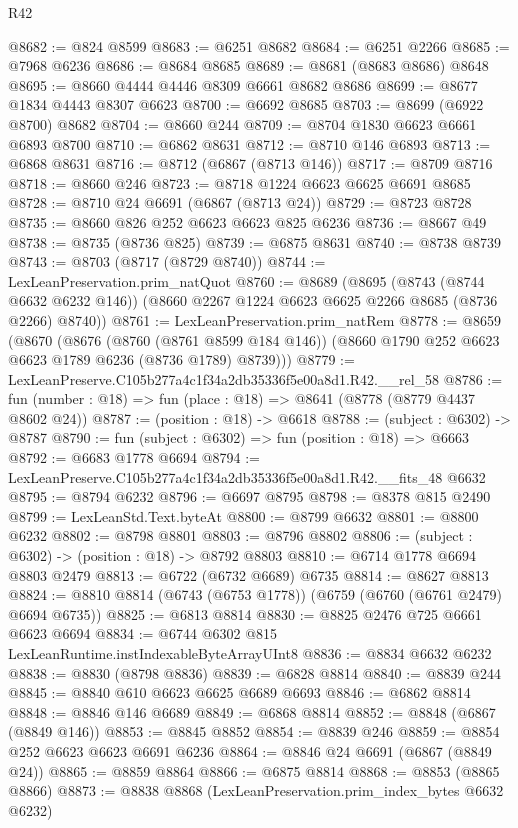 \begin{lexlean}{R42}
\begin{coremodule}
{@8682 := @824 @8599
@8683 := @6251 @8682
@8684 := @6251 @2266
@8685 := @7968 @6236
@8686 := @8684 @8685
@8689 := @8681 (@8683 @8686) @8648
@8695 := @8660 @4444 @4446 @8309 @6661 @8682 @8686
@8699 := @8677 @1834 @4443 @8307 @6623
@8700 := @6692 @8685
@8703 := @8699 (@6922 @8700) @8682
@8704 := @8660 @244
@8709 := @8704 @1830 @6623 @6661 @6893 @8700
@8710 := @6862 @8631
@8712 := @8710 @146 @6893
@8713 := @6868 @8631
@8716 := @8712 (@6867 (@8713 @146))
@8717 := @8709 @8716
@8718 := @8660 @246
@8723 := @8718 @1224 @6623 @6625 @6691 @8685
@8728 := @8710 @24 @6691 (@6867 (@8713 @24))
@8729 := @8723 @8728
@8735 := @8660 @826 @252 @6623 @6623 @825 @6236
@8736 := @8667 @49
@8738 := @8735 (@8736 @825)
@8739 := @6875 @8631
@8740 := @8738 @8739
@8743 := @8703 (@8717 (@8729 @8740))
@8744 := LexLeanPreservation.prim_natQuot
@8760 := @8689
    (@8695
      (@8743 (@8744 @6632 @6232 @146))
      (@8660 @2267 @1224 @6623 @6625 @2266 @8685 (@8736 @2266) @8740))
@8761 := LexLeanPreservation.prim_natRem
@8778 := @8659
    (@8670
      (@8676
        (@8760 (@8761 @8599 @184 @146))
        (@8660 @1790 @252 @6623 @6623 @1789 @6236 (@8736 @1789) @8739)))
@8779 := LexLeanPreserve.C105b277a4c1f34a2db35336f5e00a8d1.R42.__rel_58
@8786 := fun (number : @18) => fun (place : @18) => @8641 (@8778 (@8779 @4437 @8602 @24))
@8787 := (position : @18) -> @6618
@8788 := (subject : @6302) -> @8787
@8790 := fun (subject : @6302) => fun (position : @18) => @6663
@8792 := @6683 @1778 @6694
@8794 := LexLeanPreserve.C105b277a4c1f34a2db35336f5e00a8d1.R42.__fits_48 @6632
@8795 := @8794 @6232
@8796 := @6697 @8795
@8798 := @8378 @815 @2490
@8799 := LexLeanStd.Text.byteAt
@8800 := @8799 @6632
@8801 := @8800 @6232
@8802 := @8798 @8801
@8803 := @8796 @8802
@8806 := (subject : @6302) -> (position : @18) -> @8792 @8803
@8810 := @6714 @1778 @6694 @8803 @2479
@8813 := @6722 (@6732 @6689) @6735
@8814 := @8627 @8813
@8824 := @8810 @8814 (@6743 (@6753 @1778)) (@6759 (@6760 (@6761 @2479) @6694 @6735))
@8825 := @6813 @8814
@8830 := @8825 @2476 @725 @6661 @6623 @6694
@8834 := @6744 @6302 @815 LexLeanRuntime.instIndexableByteArrayUInt8
@8836 := @8834 @6632 @6232
@8838 := @8830 (@8798 @8836)
@8839 := @6828 @8814
@8840 := @8839 @244
@8845 := @8840 @610 @6623 @6625 @6689 @6693
@8846 := @6862 @8814
@8848 := @8846 @146 @6689
@8849 := @6868 @8814
@8852 := @8848 (@6867 (@8849 @146))
@8853 := @8845 @8852
@8854 := @8839 @246
@8859 := @8854 @252 @6623 @6623 @6691 @6236
@8864 := @8846 @24 @6691 (@6867 (@8849 @24))
@8865 := @8859 @8864
@8866 := @6875 @8814
@8868 := @8853 (@8865 @8866)
@8873 := @8838 @8868 (LexLeanPreservation.prim_index_bytes @6632 @6232)
}
\end{coremodule}
\end{lexlean}
